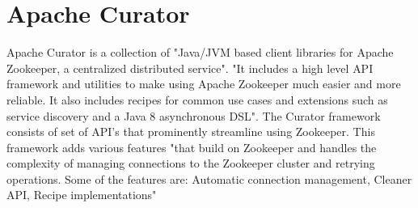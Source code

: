 \section{Apache Curator}

Apache Curator is a collection of "Java/JVM based client libraries for Apache Zookeeper,
a centralized distributed service"\cite{hid-sp18-514-apachecurator}.
"It includes a high level API framework and utilities to make using Apache Zookeeper much easier and more reliable. 
It also includes recipes for common use cases and extensions such as service discovery and a Java 8 asynchronous 
DSL"\cite{hid-sp18-514-apachecurator}.
The Curator framework consists of set of API’s that prominently streamline using Zookeeper. 
This framework adds various features 
"that build on Zookeeper and handles the complexity of managing connections to the Zookeeper cluster and retrying operations. 
Some of the features are: Automatic connection management, Cleaner API, Recipe implementations"\cite{hid-sp18-514-apachecuratorfeatures}
